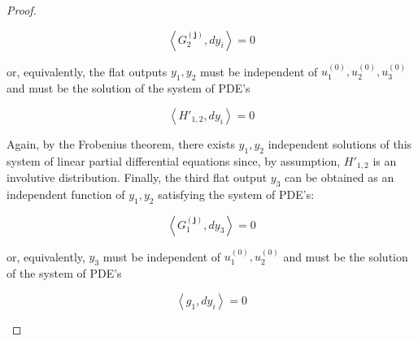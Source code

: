 \documentclass[10pt,a4paper]{amsart}
\newcommand{\bj}{\mathbf{j}}
\begin{document}
\begin{proof}
\begin{enumerate}
\[ \left< G_{2}^{(\bj)},  dy_{i} \right>= 0 \]

or, equivalently, the flat outputs $y_1,y_2$ must be independent of $u_1^{(0)},u_2^{(0)},u_3^{(0)}$ and must be the solution of the system of PDE's

\[ \left< H'_{1,2},  dy_{i} \right>= 0 \]

Again, by the Frobenius theorem, there exists $y_1,y_2$ independent solutions of this system of linear partial differential equations since, by assumption, $H'_{1,2}$ is an involutive distribution. Finally, the third flat output $y_3$ can be obtained as an independent function of $y_1,y_2$ satisfying the system of PDE's:

\[ \left< G_{1}^{(\bj)},  dy_{3} \right>= 0 \]

or, equivalently, $y_3$ must be independent of $u_1^{(0)},u_2^{(0)}$ and must be the solution of the system of PDE's

\[ \left< g_1,  dy_{i} \right>= 0 \]

\end{enumerate}

\end{proof}
\end{document}
